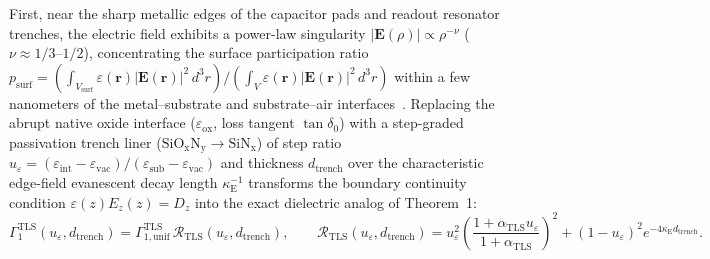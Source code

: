 \documentclass[11pt,letterpaper]{article}
\theoremstyle{definition}
\begin{document}
First, near the sharp metallic edges of the capacitor pads and readout resonator trenches, the electric field exhibits a power-law singularity $|\mathbf{E}(\rho)| \propto \rho^{-\nu}$ ($\nu \approx 1/3$--$1/2$), concentrating the surface participation ratio $p_{\mathrm{surf}} = (\int_{V_{\mathrm{surf}}} \varepsilon(\mathbf{r})|\mathbf{E}(\mathbf{r})|^2\,d^3r)/(\int_V \varepsilon(\mathbf{r})|\mathbf{E}(\mathbf{r})|^2\,d^3r)$ within a few nanometers of the metal--substrate and substrate--air interfaces~\cite{Wang2015, Woods2019}. Replacing the abrupt native oxide interface ($\varepsilon_{\mathrm{ox}}$, loss tangent $\tan\delta_0$) with a step-graded passivation trench liner ($\mathrm{SiO_xN_y} \to \mathrm{SiN_x}$) of step ratio $u_\varepsilon = (\varepsilon_{\mathrm{int}} - \varepsilon_{\mathrm{vac}})/(\varepsilon_{\mathrm{sub}} - \varepsilon_{\mathrm{vac}})$ and thickness $d_{\mathrm{trench}}$ over the characteristic edge-field evanescent decay length $\kappa_{\mathrm{E}}^{-1}$ transforms the boundary continuity condition $\varepsilon(z) E_z(z) = D_z$ into the exact dielectric analog of Theorem~1:
\begin{equation}
  \Gamma_1^{\mathrm{TLS}}(u_\varepsilon, d_{\mathrm{trench}}) = \Gamma_{1,\mathrm{unif}}^{\mathrm{TLS}} \, \mathcal{R}_{\mathrm{TLS}}(u_\varepsilon, d_{\mathrm{trench}}), \qquad \mathcal{R}_{\mathrm{TLS}}(u_\varepsilon, d_{\mathrm{trench}}) = u_\varepsilon^2 \left(\frac{1 + \alpha_{\mathrm{TLS}} u_\varepsilon}{1 + \alpha_{\mathrm{TLS}}}\right)^2 + (1 - u_\varepsilon)^2 e^{-4\kappa_{\mathrm{E}} d_{\mathrm{trench}}}.
  \label{eq:tls_screening_functional}
\end{equation}
\end{document}
